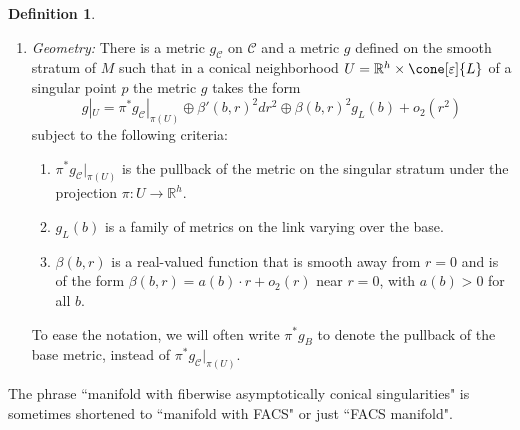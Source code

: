 \documentclass[12pt, reqno]{amsart}
\theoremstyle{plain} %
\theoremstyle{definition}
\newtheorem{definition}[theorem]{Definition}
\theoremstyle{remark}
\numberwithin{equation}{section}
\newcommand{\cat}[1]{\mathcal{#1}}
\newcommand{\field}[1]{\mathbb{#1}}
\newcommand{\R}{\field{R}}
\newcommand{\hdim}{h} %
\begin{document}
\begin{definition}
\begin{enumerate}[label=(\alph*)]
        The \textit{singular stratum}, also sometimes referred to as the \(\cat{C}_1\)-stratum (see Section \ref{sec:manifolds with iacs}), is the set of singular points of \(M\).
        The singular stratum is denoted by \(\cat{C}\).
        The smooth stratum is defined to be the complement \(M \setminus \cat{C}\).
        \item \emph{Geometry:} There is a metric \(g_\cat{C}\) on \(\cat{C}\) and a metric \(g\) defined on the smooth stratum of \(M\) such that in a conical neighborhood \(U = \R^\hdim \times \cone[\varepsilon]{L}\) of a singular point \(p\) the metric \(g\) takes the form
        \begin{equation*}
            g|_U = \pi^*g_{\cat{C}}|_{\pi(U)} \oplus \beta'(b,r)^2 dr^2 \oplus \beta(b,r)^2 g_L(b) + o_2(r^2)
        \end{equation*}
        subject to the following criteria:
        \begin{enumerate}[label=(\arabic*)]
            \item \(\pi^*g_{\cat{C}}|_{\pi(U)}\) is the pullback of the metric on the singular stratum under the projection \(\pi \colon U \to \R^\hdim\).
            \item \(g_L(b)\) is a family of metrics on the link varying over the base.
            \item \(\beta(b,r)\) is a real-valued function that is smooth away from \(r=0\) and is of the form \(\beta(b,r) = a(b) \cdot r + o_2(r)\) near \(r=0\), with \(a(b) > 0\) for all \(b\).
        \end{enumerate}
        To ease the notation, we will often write \(\pi^*g_B\) to denote the pullback of the base metric, instead of \(\pi^*g_{\cat{C}}|_{\pi(U)}\).
    \end{enumerate}
\end{definition}
The phrase ``manifold with fiberwise asymptotically conical singularities" is sometimes shortened to ``manifold with FACS" or just ``FACS manifold".
\end{document}
